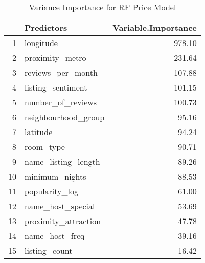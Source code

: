 \begin{table}[ht]
\centering
\begin{tabular}{rlr}
  \hline
 & Predictors & Variable.Importance \\ 
  \hline
1 & longitude & 978.10 \\ 
  2 & proximity\_metro & 231.64 \\ 
  3 & reviews\_per\_month & 107.88 \\ 
  4 & listing\_sentiment & 101.15 \\ 
  5 & number\_of\_reviews & 100.73 \\ 
  6 & neighbourhood\_group & 95.16 \\ 
  7 & latitude & 94.24 \\ 
  8 & room\_type & 90.71 \\ 
  9 & name\_listing\_length & 89.26 \\ 
  10 & minimum\_nights & 88.53 \\ 
  11 & popularity\_log & 61.00 \\ 
  12 & name\_host\_special & 53.69 \\ 
  13 & proximity\_attraction & 47.78 \\ 
  14 & name\_host\_freq & 39.16 \\ 
  15 & listing\_count & 16.42 \\ 
   \hline
\end{tabular}
\caption{Variance Importance for RF Price Model} 
\end{table}
